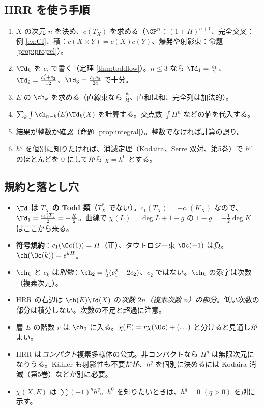 \subsection{HRR を使う手順}
\begin{enumerate}
\item $X$ の次元 $n$ を決め、$c(T_X)$ を求める（$\CP^n$：$(1+H)^{n+1}$、完全交叉：例 \ref{ex:CI}、積：$c(X\times Y)=c(X)c(Y)$、爆発や射影束：命題 \ref{prop:projrel}）。
\item $\Td_k$ を $c_i$ で書く（定理 \ref{thm:toddlow}）。$n\le3$ なら $\Td_1=\frac{c_1}2$、$\Td_2=\frac{c_1^2+c_2}{12}$、$\Td_3=\frac{c_1c_2}{24}$ で十分。
\item $E$ の $\ch_k$ を求める（直線束なら $\frac{l^k}{k!}$、直和は和、完全列は加法的）。
\item $\sum_k\int\ch_{n-k}(E)\Td_k(X)$ を計算する。交点数 $\int H^n$ などの値を代入する。
\item 結果が整数か確認（命題 \ref{prop:integral}）。整数でなければ計算の誤り。
\item $h^q$ を個別に知りたければ、消滅定理（Kodaira、Serre 双対、第5巻）で $h^q$ のほとんどを $0$ にしてから $\chi=h^0$ とする。
\end{enumerate}
\subsection{規約と落とし穴}
\begin{itemize}
\item \textbf{$\Td$ は $T_X$ の Todd 類}（$T^*_X$ でない）。$c_1(T_X)=-c_1(K_X)$ なので、$\Td_1=\frac{c_1(T)}2=-\frac K2$。曲線で $\chi(L)=\deg L+1-g$ の $1-g=-\frac12\deg K$ はここから来る。
\item \textbf{符号規約}：$c_1(\Oc(1))=H$（正）、タウトロジー束 $\Oc(-1)$ は負。$\ch(\Oc(k))=e^{kH}$。
\item $\ch_k$ と $c_k$ は\emph{別物}：$\ch_2=\frac12(c_1^2-2c_2)$、$c_2$ ではない。$\ch_k$ の添字は次数（複素次元）。
\item HRR の右辺は $\ch(E)\Td(X)$ の\emph{次数 $2n$（複素次数 $n$）の部分}。低い次数の部分は積分しない。次数の不足と超過に注意。
\item 層 $E$ の階数 $r$ は $\ch_0$ に入る。$\chi(E)=r\chi(\Oc)+(\ldots)$ と分けると見通しがよい。
\item HRR は\emph{コンパクト}複素多様体の公式。非コンパクトなら $H^q$ は無限次元になりうる。Kähler も射影性も不要だが、$h^q$ を個別に決めるには Kodaira 消滅（第5巻）などが別に必要。
\item $\chi(X,E)$ は $\sum(-1)^q h^q$。$h^0$ を知りたいときは、$h^q=0$ $(q>0)$ を別に示す。
\end{itemize}
